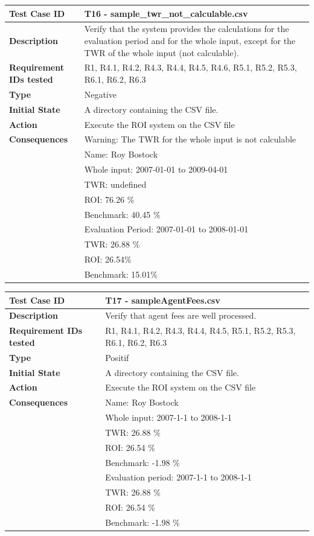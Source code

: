 \documentclass[runningheads,12pt]{article}
\begin{document}
{%
\bigskip
\centering
\begin{tabular}{|p{1.2in}|p{4in}|}
\hline
\textbf{Test Case ID} & T16 - sample\_twr\_not\_calculable.csv \\ 
\hline
\textbf{Description} & Verify that the system provides the calculations for the evaluation period and for the whole input, except for the TWR of the whole input (not calculable).\\
\hline
\textbf{Requirement IDs tested} & R1, R4.1, R4.2, R4.3, R4.4, R4.5, R4.6, R5.1, R5.2, R5.3, R6.1, R6.2, R6.3 \\ 
\hline
\textbf{Type} & Negative \\ 
\hline
\textbf{Initial State} & A directory containing the CSV file.\\
\hline 
\textbf{Action} & Execute the ROI system on the CSV file \\
\hline 
\textbf{Consequences} & Warning: The TWR for the whole input is not calculable\\
& Name: Roy Bostock\\
& Whole input: 2007-01-01 to 2009-04-01\\
& TWR:  undefined\\
& ROI: 76.26 $\%$\\
& Benchmark: 40.45 $\%$ \\ 
& Evaluation Period: 2007-01-01 to 2008-01-01\\
& TWR: 26.88 $\%$\\
& ROI: 26.54$\%$\\
& Benchmark: 15.01$\%$ \\ 
\hline
\end{tabular}
\bigskip
\centering
\begin{tabular}{|p{1.2in}|p{4in}|}
\hline
\textbf{Test Case ID} & T17 - sampleAgentFees.csv \\ 
\hline
\textbf{Description} & Verify that agent fees are well processed.\\
\hline
\textbf{Requirement IDs tested} & R1, R4.1, R4.2, R4.3, R4.4, R4.5, R5.1, R5.2, R5.3, R6.1, R6.2, R6.3 \\ 
\hline
\textbf{Type} & Positif \\ 
\hline
\textbf{Initial State} & A directory containing the CSV file.\\
\hline 
\textbf{Action} & Execute the ROI system on the CSV file \\
\hline 
\textbf{Consequences} & Name: Roy Bostock\\
&Whole input: 2007-1-1 to 2008-1-1\\
&TWR: 26.88 $\%$\\
&ROI: 26.54  $\%$\\
&Benchmark: -1.98  $\%$\\
&Evaluation period: 2007-1-1 to 2008-1-1\\
&TWR: 26.88  $\%$\\
&ROI: 26.54 $\%$\\
&Benchmark: -1.98  $\%$\\
\hline
\end{tabular}

}
\end{document}
